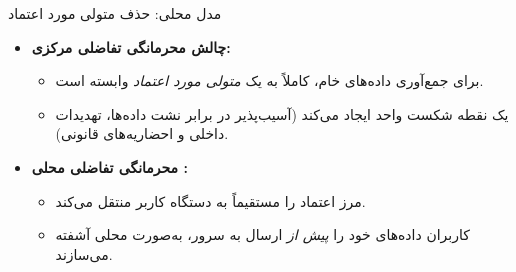 \documentclass[10pt]{beamer}
\begin{document}
	\begin{frame}{مدل محلی: حذف متولی مورد اعتماد}
		\begin{itemize}
			\item \textbf{چالش محرمانگی تفاضلی مرکزی:}   
			\begin{itemize}
				\item برای جمع‌آوری داده‌های خام، کاملاً به یک \textit{متولی مورد اعتماد} وابسته است.
				\item یک نقطه شکست واحد ایجاد می‌کند (آسیب‌پذیر در برابر نشت داده‌ها، تهدیدات داخلی و احضاریه‌های قانونی).
			\end{itemize}
			
			\pause
			\vspace{0.4cm}
			\item \textbf{محرمانگی تفاضلی محلی :}
			\begin{itemize}
				\item مرز اعتماد را مستقیماً به دستگاه کاربر منتقل می‌کند.
				\item کاربران داده‌های خود را \textit{پیش از} ارسال به سرور، به‌صورت محلی آشفته می‌سازند.
			\end{itemize}
		\end{itemize}      
	\end{frame}
	
	
\end{document}
